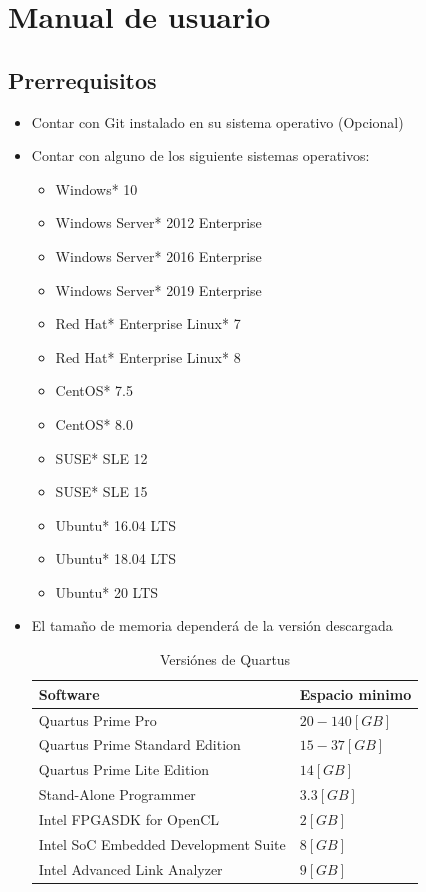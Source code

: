 \documentclass{IEEEtran}
\begin{document}
\section{Manual de usuario}
\label{sec:org1024be5}
\subsection{Prerrequisitos}
\label{sec:org2d0d4f6}
\begin{itemize}
\item Contar con Git instalado en su sistema operativo (Opcional)
\item Contar con alguno de los siguiente sistemas operativos:
\begin{itemize}
\item Windows* 10
\item Windows Server* 2012 Enterprise
\item Windows Server* 2016 Enterprise
\item Windows Server* 2019 Enterprise
\item Red Hat* Enterprise Linux* 7
\item Red Hat* Enterprise Linux* 8
\item CentOS* 7.5
\item CentOS* 8.0
\item SUSE* SLE 12
\item SUSE* SLE 15
\item Ubuntu* 16.04 LTS
\item Ubuntu* 18.04 LTS
\item Ubuntu* 20 LTS
\end{itemize}
\item El tamaño de memoria dependerá de la versión descargada
\begin{table}[htbp]
\caption{Versiónes de Quartus}
\centering
\begin{tabular}{ll}
\hline
Software & Espacio minimo\\
\hline
Quartus Prime Pro & \(20-140[GB]\)\\
Quartus Prime Standard Edition & \(15-37[GB]\)\\
Quartus Prime Lite Edition & \(14[GB]\)\\
Stand-Alone Programmer & \(3.3[GB]\)\\
Intel FPGASDK for OpenCL & \(2[GB]\)\\
Intel SoC Embedded Development Suite & \(8[GB]\)\\
Intel Advanced Link Analyzer & \(9[GB]\)\\
\hline
\end{tabular}
\end{table}
\end{itemize}
\end{document}
